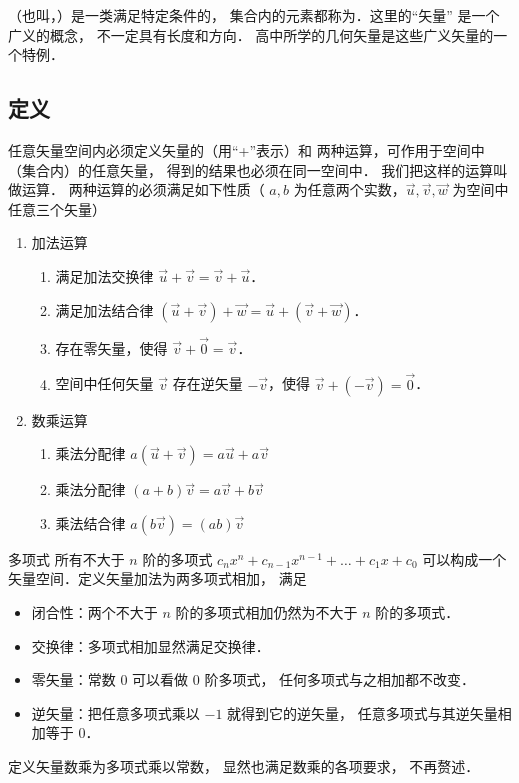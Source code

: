 

（也叫，）是一类满足特定条件的， 集合内的元素都称为．这里的“矢量” 是一个广义的概念， 不一定具有长度和方向． 高中所学的几何矢量是这些广义矢量的一个特例．

\subsection{定义}
任意矢量空间内必须定义矢量的（用“+”表示）和 两种运算，可作用于空间中（集合内）的任意矢量， 得到的结果也必须在同一空间中． 我们把这样的运算叫做运算． 两种运算的必须满足如下性质（ $a,b$ 为任意两个实数，$\vec u,\vec v,\vec w$ 为空间中任意三个矢量）
\begin{enumerate}
\item 加法运算
\begin{enumerate}
\item 满足加法交换律 $\vec u + \vec v = \vec v + \vec u$．
\item 满足加法结合律 $(\vec u + \vec v) + \vec w = \vec u + (\vec v + \vec w)$．
\item 存在零矢量，使得 $\vec v + \vec 0 = \vec v$．
\item 空间中任何矢量 $\vec v$ 存在逆矢量 $-\vec v$，使得 $\vec v + (-\vec v) = \vec 0$．
\end{enumerate}

\item 数乘运算
\begin{enumerate}
\item 乘法分配律 $a(\vec u + \vec v) = a\vec u + a\vec v$ 
\item 乘法分配律 $(a + b)\vec v = a\vec v + b\vec v$
\item 乘法结合律 $a (b \vec v) = (ab) \vec v$
\end{enumerate}
\end{enumerate}

\begin{exam}{多项式}
所有不大于 $n$ 阶的多项式 $c_n x^n + c_{n-1} x^{n-1} + \dots + c_1 x + c_0$ 可以构成一个矢量空间．定义矢量加法为两多项式相加， 满足
\begin{itemize}
\item 闭合性：两个不大于 $n$ 阶的多项式相加仍然为不大于 $n$ 阶的多项式．
\item 交换律：多项式相加显然满足交换律．
\item 零矢量：常数 0 可以看做 0 阶多项式， 任何多项式与之相加都不改变．
\item 逆矢量：把任意多项式乘以 $-1$ 就得到它的逆矢量， 任意多项式与其逆矢量相加等于 0．
\end{itemize}
定义矢量数乘为多项式乘以常数， 显然也满足数乘的各项要求， 不再赘述．
\end{exam}

